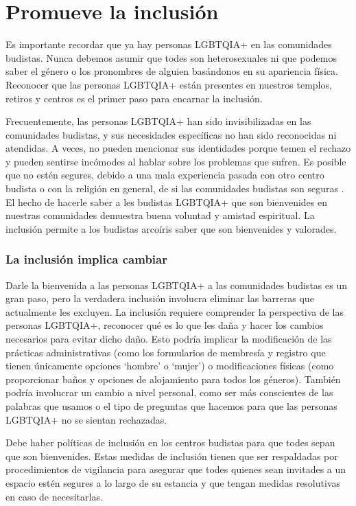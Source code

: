 \documentclass[12pt,openany]{book}
\begin{document}
\section*{Promueve la inclusión}

Es importante recordar que ya hay personas LGBTQIA+ en las comunidades budistas. Nunca debemos asumir que todes son heterosexuales ni que podemos saber el género o los pronombres de alguien basándonos en su apariencia física. Reconocer que las personas LGBTQIA+ están presentes en nuestros templos, retiros y centros es el primer paso para encarnar la inclusión.

Frecuentemente, las personas LGBTQIA+ han sido invisibilizadas en las comunidades budistas, y sus necesidades específicas no han sido reconocidas ni atendidas. A veces, no pueden mencionar sus identidades porque temen el rechazo y pueden sentirse incómodes al hablar sobre los problemas que sufren. Es posible que no estén segures, debido a una mala experiencia pasada con otro centro budista o con la religión en general, de si las comunidades budistas son seguras . El hecho de hacerle saber a les budistas LGBTQIA+ que son bienvenides en nuestras comunidades demuestra buena voluntad y amistad espiritual. La inclusión permite a los budistas arcoíris saber que son bienvenides y valorades.

\subsubsection*{La inclusión implica cambiar}

Darle la bienvenida a las personas LGBTQIA+ a las comunidades budistas es un gran paso, pero la verdadera inclusión involucra eliminar las barreras que actualmente les excluyen. La inclusión requiere comprender la perspectiva de las personas LGBTQIA+, reconocer qué es lo que les daña y hacer los cambios necesarios para evitar dicho daño. Esto podría implicar la modificación de las prácticas administrativas (como los formularios de membresía y registro que tienen únicamente opciones `hombre' o `mujer') o modificaciones físicas (como proporcionar baños y opciones de alojamiento para todos los géneros). También podría involucrar un cambio a nivel personal, como ser más conscientes de las palabras que usamos o el tipo de preguntas que hacemos para que las personas LGBTQIA+ no se sientan rechazadas.

Debe haber políticas de inclusión en los centros budistas para que todes sepan que son bienvenides. Estas medidas de inclusión tienen que ser respaldadas por procedimientos de vigilancia para asegurar que todes quienes sean invitades a un espacio estén segures a lo largo de su estancia y que tengan medidas resolutivas en caso de necesitarlas.
\end{document}
